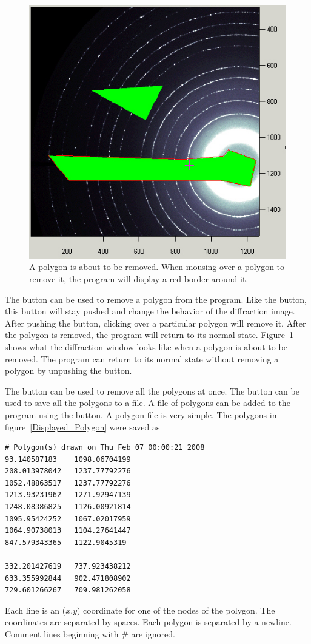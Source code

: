 \begin{figure}
    \centering
    \includegraphics[scale=.75]{figures/Removing_Polygon.eps}
    \caption{A polygon is about to be removed.
    When mousing over a polygon to remove it,
    the program will display a red border around it.}
    \label{Removing_Polygon}
\end{figure}

The  button can be used to remove
a polygon from the program. Like the  
button, this button will stay pushed and change the
behavior of the diffraction image. After pushing the 
 button, clicking over
a particular polygon will remove it.
After the polygon is removed, the program will 
return to its normal state.
Figure~\ref{Removing_Polygon} shows what the diffraction
window looks like when a polygon is about to be removed.
The program can return to its normal state without
removing a polygon by unpushing the 
button.

The  button can be used to remove
all the polygons at once. The  button
can be used to save all the polygons to a file.
A file of polygons can be added to the program 
using the 
 button. A polygon
file is very simple. The polygons in 
figure~\ref{Displayed_Polygon} were saved as
\begin{lstlisting}[caption={'polygons.dat'}]
# Polygon(s) drawn on Thu Feb 07 00:00:21 2008
93.140587183	1098.06704199
208.013978042	1237.77792276
1052.48863517	1237.77792276
1213.93231962	1271.92947139
1248.08386825	1126.00921814
1095.95424252	1067.02017959
1064.90738013	1104.27641447
847.579343365	1122.9045319

332.201427619	737.923438212
633.355992844	902.471808902
729.601266267	709.981262058
\end{lstlisting}
Each line is an ($x$,$y$) coordinate for one of 
the nodes of the polygon.  The coordinates are separated
by spaces. Each polygon is separated by a newline.  
Comment lines beginning with \# are 
ignored. 

